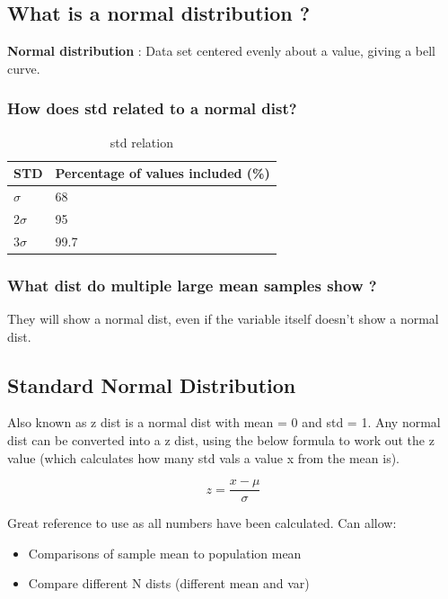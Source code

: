 \documentclass[11pt]{scrartcl} %
\begin{document}
\subsection{What is a normal distribution
?}

\textbf{Normal distribution} : Data set centered evenly about a value,
giving a bell curve.

\subsubsection{How does std related to a normal dist?}

\begin{table}[h] %
	\centering %
	\begin{tabular}{l P{2.5cm}}
		\toprule
		\textbf{STD} & \textbf{Percentage of values included (\%)}\\
		\midrule
		\(\sigma\) & 68 \\
		\(2\sigma\) & 95 \\
		\(3\sigma\) & 99.7 \\
		\bottomrule
	\end{tabular}
	\caption{std relation}
\end{table}

\subsubsection{What dist do multiple large mean samples show ?}

They will show a normal dist, even if the variable itself doesn't show a normal dist.

\subsection{Standard Normal Distribution}

Also known as z dist is a normal dist with mean = 0 and std = 1. Any normal dist can be converted
into a z dist, using the below formula to work out the z value (which calculates how many std vals
a value x from the mean is).

\begin{equation}
	z = \frac{x - \mu}{\sigma}
\end{equation}

Great reference to use as all numbers have been calculated. Can allow:

\begin{itemize}
	\item Comparisons of sample mean to population mean
	\item Compare different N dists (different mean and var)
\end{itemize}
\end{document}
